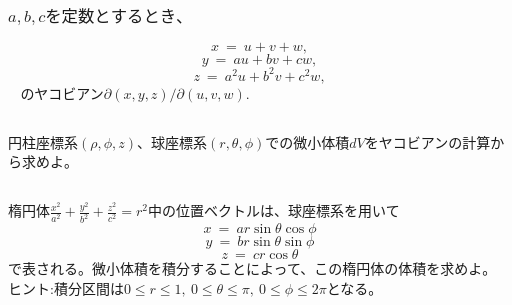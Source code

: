 \documentclass[a4paper,11pt,fleqn]{jarticle}
\begin{document}
\newpage
\subsubsection{$a,b,cを定数とするとき、$}
$$x~=~u+v+w,$$
$$y~=~au+bv+cw,$$
$$z~=~a^2u+b^2v+c^2w,$$
$~~~~$のヤコビアン$\partial (x,y,z)/\partial (u,v,w)$.

\newpage
\subsection{}
円柱座標系$(\rho ,\phi ,z)$、球座標系$(r,\theta ,\phi)$での微小体積$dV$をヤコビアンの計算から求めよ。

\newpage
\subsection{}
楕円体$\frac{x^2}{a^2}+\frac{y^2}{b^2}+\frac{z^2}{c^2}=r^2$中の位置ベクトルは、球座標系を用いて
$$x~=~ar\sin\theta\cos\phi$$
$$y~=~br\sin\theta\sin\phi$$
$$z~=~cr\cos\theta$$
で表される。微小体積を積分することによって、この楕円体の体積を求めよ。\\
ヒント:積分区間は$0\leq r\leq 1,~0\leq\theta\leq \pi ,~0\leq\phi\leq 2\pi$となる。
\end{document}
